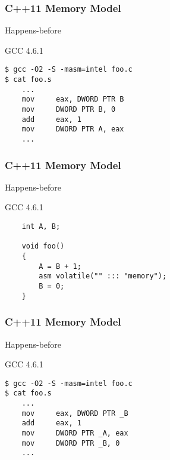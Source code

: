 \begin{frame}[fragile]
    \frametitle{C++11 Memory Model}
    \LARGE
    Happens-before
    \large    
    
    GCC 4.6.1
    \begin{block}{}
        \begin{verbatim}
$ gcc -O2 -S -masm=intel foo.c
$ cat foo.s
    ...
    mov     eax, DWORD PTR B
    mov     DWORD PTR B, 0
    add     eax, 1
    mov     DWORD PTR A, eax
    ...
        \end{verbatim}
    \end{block}
    
\end{frame}


\begin{frame}[fragile]
    \frametitle{C++11 Memory Model}
    \LARGE
    Happens-before
    \large    
    
    GCC 4.6.1
    \begin{block}{}
        \begin{verbatim}
    int A, B;
    
    void foo()
    {
        A = B + 1;
        asm volatile("" ::: "memory");
        B = 0;
    }
        \end{verbatim}
    \end{block}
    
\end{frame}


\begin{frame}[fragile]
    \frametitle{C++11 Memory Model}
    \LARGE
    Happens-before
    \large    
    
    GCC 4.6.1
    \begin{block}{}
        \begin{verbatim}
$ gcc -O2 -S -masm=intel foo.c
$ cat foo.s
    ...
    mov     eax, DWORD PTR _B
    add     eax, 1
    mov     DWORD PTR _A, eax
    mov     DWORD PTR _B, 0
    ...
        \end{verbatim}
    \end{block}
    
\end{frame}


